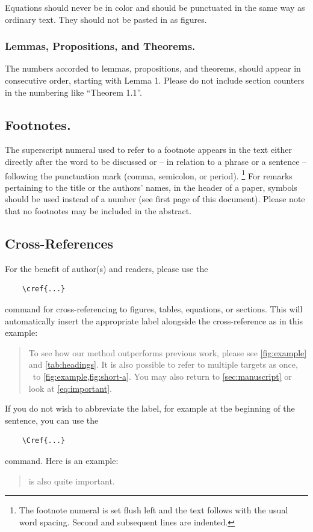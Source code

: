 \documentclass[runningheads]{llncs}
\begin{document}
Equations should never be in color and should be punctuated in the same way as ordinary text. 
They should not be pasted in as figures.


\subsubsection{Lemmas, Propositions, and Theorems.}
The numbers accorded to lemmas, propositions, and theorems, \etc should appear in consecutive order, starting with Lemma 1. 
Please do not include section counters in the numbering like ``Theorem 1.1''.


\subsection{Footnotes.}
The superscript numeral used to refer to a footnote appears in the text either directly after the word to be discussed or -- in relation to a phrase or a sentence -- following the punctuation mark (comma, semicolon, or period).%
\footnote{The footnote numeral is set flush left and the text follows with the usual word spacing. 
  Second and subsequent lines are indented. 
}
For remarks pertaining to the title or the authors' names, in the header of a paper, symbols should be used instead of a number (see first page of this document). 
Please note that no footnotes may be included in the abstract.


\subsection{Cross-References}
For the benefit of author(s) and readers, please use the
{\small
  \begin{verbatim}
    \cref{...}
  \end{verbatim}
}
command for cross-referencing to figures, tables, equations, or sections.
This will automatically insert the appropriate label alongside the cross-reference as in this example:
\begin{quotation}
  To see how our method outperforms previous work, please see \cref{fig:example} and \cref{tab:headings}.
  It is also possible to refer to multiple targets as once, \eg~to \cref{fig:example,fig:short-a}.
  You may also return to \cref{sec:manuscript} or look at \cref{eq:important}.
\end{quotation}
If you do not wish to abbreviate the label, for example at the beginning of the sentence, you can use the
{\small
  \begin{verbatim}
    \Cref{...}
  \end{verbatim}
}
command. Here is an example:
\begin{quotation}
   is also quite important.
\end{quotation}
\end{document}
